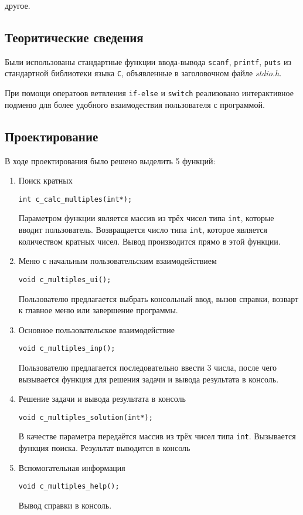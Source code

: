 \documentclass[12pt,a4paper]{report}
\begin{document}
другое.

\subsection{Теоритические сведения}
\hspace{\parindent}Были использованы стандартные функции ввода-вывода 
\texttt{scanf}, \texttt{printf}, \texttt{puts} из стандартной библиотеки языка \verb+С+, 
объявленные в заголовочном файле \textit{stdio.h}.

При помощи оператоов ветвления \texttt{if-else} и \texttt{switch} реализовано интерактивное подменю для более удобного взаимодествия пользователя с программой.


\subsection{Проектирование}
\hspace{\parindent}В ходе проектирования было решено выделить 5 функций:
\begin{enumerate}
	\item Поиск кратных
 	
 	\verb+int c_calc_multiples(int*);+
 	
	Параметром функции является массив из трёх чисел типа \verb+int+, которые вводит пользователь.
	Возвращается число типа \verb+int+, которое является количеством кратных чисел.
	Вывод производится прямо в этой функции.	 
		 
	\item Меню с начальным пользовательским взаимодействием
	
	\verb+void c_multiples_ui();+
	
	Пользователю предлагается выбрать консольный ввод, вызов справки, возварт к главное меню или завершение программы.
	
	\item Основное пользовательское взаимодействие
	
	\verb+void c_multiples_inp();+
	
	Пользователю предлагается последовательно ввести 3 числа, после чего вызывается функция для решения задачи и вывода результата в консоль.
	
	\item Решение задачи и вывода результата в консоль
	
	\verb+void c_multiples_solution(int*);+
	
	В качестве параметра передаётся массив из трёх чисел типа \verb+int+. Вызывается функция поиска. Результат выводится в консоль 

	\item Вспомогательная информация
	
	\verb+void c_multiples_help();+
	
	Вывод справки в консоль.
\end{enumerate}
\end{document}

